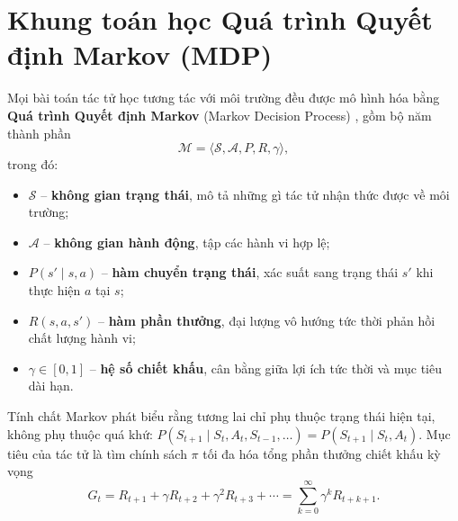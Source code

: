 \section{Khung toán học Quá trình Quyết định Markov (MDP)}
Mọi bài toán tác tử học tương tác với môi trường đều được mô hình hóa bằng \textbf{Quá trình Quyết định Markov} (Markov
Decision Process) \cite{sutton_barto}, gồm bộ năm thành phần
\[
  \mathcal{M} = \langle \mathcal{S}, \mathcal{A}, P, R, \gamma \rangle,
\]
trong đó:
\begin{itemize}
  \item $\mathcal{S}$ -- \textbf{không gian trạng thái}, mô tả những gì tác tử nhận thức được về môi trường;
  \item $\mathcal{A}$ -- \textbf{không gian hành động}, tập các hành vi hợp lệ;
  \item $P(s' \mid s, a)$ -- \textbf{hàm chuyển trạng thái}, xác suất sang trạng thái $s'$ khi thực hiện $a$ tại $s$;
  \item $R(s, a, s')$ -- \textbf{hàm phần thưởng}, đại lượng vô hướng tức thời phản hồi chất lượng hành vi;
  \item $\gamma \in [0,1]$ -- \textbf{hệ số chiết khấu}, cân bằng giữa lợi ích tức thời và mục tiêu dài hạn.
\end{itemize}
Tính chất Markov phát biểu rằng tương lai chỉ phụ thuộc trạng thái hiện tại, không phụ thuộc quá khứ:
$P(S_{t+1} \mid S_t, A_t, S_{t-1}, \dots) = P(S_{t+1} \mid S_t, A_t)$. Mục tiêu của tác tử là tìm chính sách $\pi$ tối
đa hóa tổng phần thưởng chiết khấu kỳ vọng
\[
  G_t = R_{t+1} + \gamma R_{t+2} + \gamma^2 R_{t+3} + \cdots = \sum_{k=0}^{\infty} \gamma^k R_{t+k+1}.
\]

